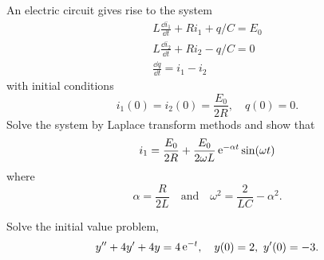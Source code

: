 {\begin{Exercise}
\end{Exercise}





\begin{Exercise}
  \label{exercise circuit i1 i2 q}
  An electric circuit gives rise to the system
  \begin{gather*}
    L \frac{\dd i_1}{\dd t} + R i_1 + q / C = E_0\\
    L \frac{\dd i_2}{\dd t} + R i_2 - q / C = 0\\
    \frac{\dd q}{\dd t} = i_1 - i_2
  \end{gather*}
  with initial conditions
  \[
  i_1(0)=i_2(0)=\frac{E_0}{2R},\quad q(0) = 0.
  \]
  Solve the system by Laplace transform methods and show that
  \[
  i_1= \frac{E_0}{2R}+\frac{E_0}{2 \omega L} \mathop{\mathrm{e}}\nolimits^{-\alpha t} \sin(\omega t)
  \]
  where
  \[
  \alpha = \frac{R}{2L}\quad \mathrm{and} \quad \omega^2 = \frac{2}{LC} - \alpha^2.
  \]

\end{Exercise}






\begin{Exercise}
  \label{exercise y4y4y=4e-t}
  Solve the initial value problem,
  \[
  y''+ 4 y' + 4 y = 4 \mathop{\mathrm{e}}\nolimits^{-t}, \quad y(0) = 2,~ y'(0) = -3.
  \]

\end{Exercise}

















\raggedbottom
}
